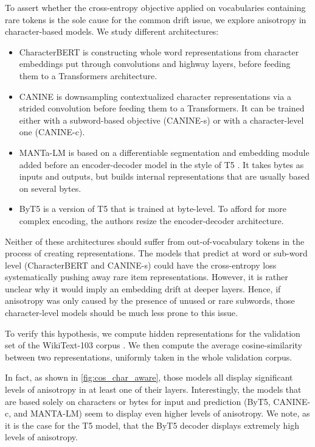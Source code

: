 To assert whether the cross-entropy objective applied on vocabularies containing rare tokens is the sole cause for the common drift issue, we explore anisotropy in character-based models. We study different architectures:
\begin{itemize}
    \item CharacterBERT \citep{el-boukkouri-etal-2020-characterbert} is constructing whole word representations from character embeddings put through convolutions and highway layers, before feeding them to a Transformers architecture.
    \item CANINE \citep{clark-etal-2022-canine} is downsampling contextualized character representations via a strided convolution before feeding them to a Transformers. It can be trained either with a subword-based objective (CANINE-s) or with a character-level one (CANINE-c).
    \item MANTa-LM \citep{godey-etal-2022-manta} is based on a differentiable segmentation and embedding module added before an encoder-decoder model in the style of T5 \citep{2020t5}. It takes bytes as inputs and outputs, but builds internal representations that are usually based on several bytes.
    \item ByT5 \citep{xue-etal-2022-byt5} is a version of T5 that is trained at byte-level. To afford for more complex encoding, the authors resize the encoder-decoder architecture.
\end{itemize}

Neither of these architectures should suffer from out-of-vocabulary tokens in the process of creating representations. The models that predict at word or sub-word level (CharacterBERT and CANINE-s) could have the cross-entropy loss systematically pushing away rare item representations. However, it is rather unclear why it would imply an embedding drift at deeper layers. Hence, if anisotropy was only caused by the presence of unused or rare subwords, those character-level models should be much less prone to this issue.

To verify this hypothesis, we compute hidden representations for the validation set of the WikiText-103 corpus \citep{merity2017pointer}. We then compute the average cosine-similarity between two representations, uniformly taken in the whole validation corpus.

In fact, as shown in \autoref{fig:cos_char_aware}, those models all display significant levels of anisotropy in at least one of their layers. Interestingly, the models that are based solely on characters or bytes for input and prediction (ByT5, CANINE-c, and MANTA-LM) seem to display even higher levels of anisotropy. We note, as it is the case for the T5 model, that the ByT5 decoder displays extremely high levels of anisotropy.


